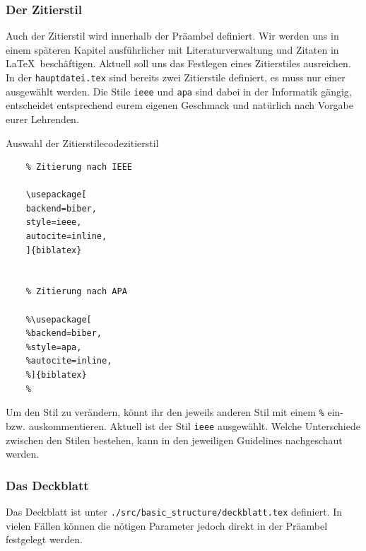 \subsubsection{Der Zitierstil}\label{zitierstil}

Auch der Zitierstil wird innerhalb der Präambel definiert. Wir werden uns in
einem späteren Kapitel ausführlicher mit Literaturverwaltung und Zitaten in
\LaTeX~beschäftigen. Aktuell soll uns das Festlegen eines Zitierstiles
ausreichen.\\ In der \texttt{hauptdatei.tex} sind bereits zwei Zitierstile
definiert, es muss nur einer ausgewählt werden. Die Stile \texttt{ieee} und
\texttt{apa} sind dabei in der Informatik gängig, entscheidet entsprechend eurem
eigenen Geschmack und natürlich nach Vorgabe eurer Lehrenden.

\begin{code}{Auswahl der Zitierstile}{codezitierstil}
	\begin{verbatim}
	% Zitierung nach IEEE

	\usepackage[
	backend=biber,
	style=ieee,
	autocite=inline,
	]{biblatex}
	

	% Zitierung nach APA

	%\usepackage[
	%backend=biber,
	%style=apa,
	%autocite=inline,
	%]{biblatex}
	%
	\end{verbatim}
\end{code}

Um den Stil zu verändern, könnt ihr den jeweils anderen Stil mit einem
\texttt{\%} ein- bzw. auskommentieren. Aktuell ist der Stil \texttt{ieee}
ausgewählt. Welche Unterschiede zwischen den Stilen bestehen, kann in den
jeweiligen Guidelines nachgeschaut werden.

\subsubsection{Das Deckblatt}\label{dasdeckblatt}

Das Deckblatt ist unter \texttt{./src/basic\_structure/deckblatt.tex} definiert.
In vielen Fällen können die nötigen Parameter jedoch direkt in der Präambel
festgelegt werden.


